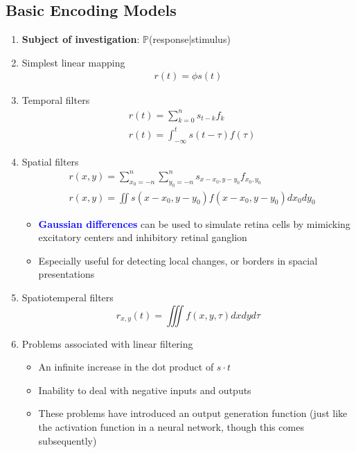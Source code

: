 \documentclass[11pt]{article}
\begin{document}
\subsection{Basic Encoding Models}
\begin{enumerate}
    \item \textbf{Subject of investigation}: $\mathbb{P}$(response|stimulus)
    \item Simplest linear mapping
    \begin{align*}
        r(t)=\phi s(t)
    \end{align*}
    \item Temporal filters
    \begin{align*}
        &r(t)=\sum_{k=0}^n s_{t-k}f_k\\
        &r(t)=\int_{-\infty}^t s(t-\tau)f(\tau)
    \end{align*}
    \item  Spatial filters
    \begin{align*}
        &r(x,y)=\sum_{x_0=-n}^n \sum_{y_0=-n}^n s_{x-x_0,y-y_0}f_{x_0,y_0}\\
        &r(x,y)=\iint s(x-x_0,y-y_0)f(x-x_0,y-y_0)dx_0dy_0
    \end{align*}
    \begin{itemize}
        \item \textcolor{Blue}{\textbf{Gaussian differences}} can be used to simulate retina cells by mimicking excitatory centers and inhibitory retinal ganglion
        \item Especially useful for detecting local changes, or borders in spacial presentations
    \end{itemize}
    \item Spatiotemperal filters
    \begin{equation*}
        r_{x,y}(t)=\iiint f(x,y,\tau) dx dy d\tau
    \end{equation*}
    \item Problems associated with linear filtering
    \begin{itemize}
        \item An infinite increase in the dot product of $s\cdot t$
        \item Inability to deal with negative inputs and outputs
        \item These problems have introduced an output generation function (just like the activation function in a neural network, though this comes subsequently)
    \end{itemize}
\end{enumerate}
\end{document}
